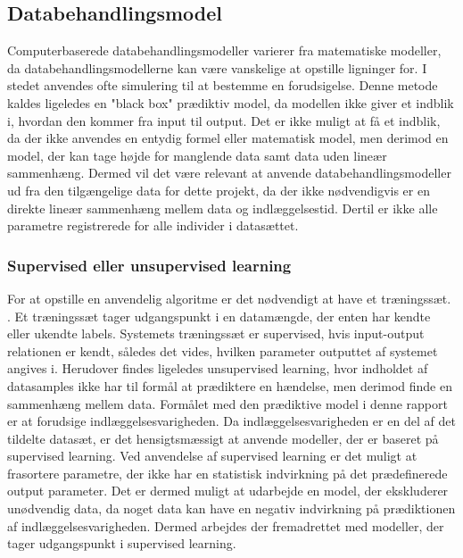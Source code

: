 \subsection{Databehandlingsmodel}
Computerbaserede databehandlingsmodeller varierer fra matematiske modeller, da databehandlingsmodellerne kan være vanskelige at opstille ligninger for. I stedet anvendes ofte simulering til at bestemme en forudsigelse. Denne metode kaldes ligeledes en "black box" prædiktiv model, da modellen ikke giver et indblik i, hvordan den kommer fra input til output. Det er ikke muligt at få et indblik, da der ikke anvendes en entydig formel eller matematisk model, men derimod en model, der kan tage højde for manglende data samt data uden lineær sammenhæng. Dermed vil det være relevant at anvende databehandlingsmodeller ud fra den tilgængelige data for dette projekt, da der ikke nødvendigvis er en direkte lineær sammenhæng mellem data og indlæggelsestid. Dertil er ikke alle parametre registrerede for alle individer i datasættet. \cite{Kuhn2013}

\subsubsection{Supervised eller unsupervised learning}
For at opstille en anvendelig algoritme er det nødvendigt at have et træningssæt. 
\cite{DIKU2010}. Et træningssæt tager udgangspunkt i en datamængde, der enten har kendte eller ukendte labels. Systemets træningssæt er supervised, hvis input-output relationen er kendt, således det vides, hvilken parameter outputtet af systemet angives i. \cite{Brownlee2013} Herudover findes ligeledes unsupervised learning, hvor indholdet af datasamples ikke har til formål at prædiktere en hændelse, men derimod finde en sammenhæng mellem data.\cite{Brownlee2013, Kuhn2013} Formålet med den prædiktive model i denne rapport er at forudsige indlæggelsesvarigheden. Da indlæggelsesvarigheden er en del af det tildelte datasæt, er det hensigtsmæssigt at anvende modeller, der er baseret på supervised learning. Ved anvendelse af supervised learning er det muligt at frasortere parametre, der ikke har en statistisk indvirkning på det prædefinerede output parameter. Det er dermed muligt at udarbejde en model, der ekskluderer unødvendig data, da noget data kan have en negativ indvirkning på prædiktionen af indlæggelsesvarigheden. Dermed arbejdes der fremadrettet med modeller, der tager udgangspunkt i supervised learning.

